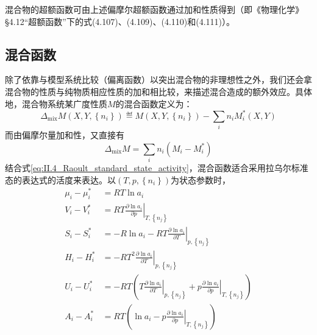 \documentclass[main.tex]{subfiles}
\begin{document}
混合物的超额函数可由上述偏摩尔超额函数通过加和性质得到（即《物理化学》\S4.12“超额函数”下的式(4.107)、(4.109)、(4.110)和(4.111)）。

\subsection{混合函数}\label{sec:II.4.6 mixing_function}
除了依靠与模型系统比较（偏离函数）以突出混合物的非理想性之外，我们还会拿混合物的性质与纯物质相应性质的加和相比较，来描述混合造成的额外效应。具体地，混合物系统某广度性质$M$的混合函数定义为：
\begin{equation}\label{eq:II.4_def_mixing_function}
  \Delta_\text{mix}M\left(X,Y,\left\{n_i\right\}\right)\eqdef M\left(X,Y,\left\{n_i\right\}\right)-\sum_in_iM_i^*\left(X,Y\right)
\end{equation}
而由偏摩尔量加和性，又直接有
\[\Delta_\text{mix}M=\sum_in_i\left(M_i-M_i^*\right)\]
结合式\eqref{eq:II.4_Raoult_standard_state_activity}，混合函数适合采用拉乌尔标准态的表达式的活度来表达。以$\left(T,p,\left\{n_i\right\}\right)$为状态参数时，
\begin{align}
  \mu_i-\mu_i^* & =RT\ln a_i\label{eq:II.4_chemical_potential_mixing_activity_expression}                                                                                                                                              \\
  V_i-V_i^*     & =RT\left.\frac{\partial\ln a_i}{\partial p}\right|_{T,\left\{n_j\right\}}\label{eq:II.4_partial_V_mixing_activity_expression}                                                                                        \\
  S_i-S_i^*     & =-R\ln a_i-RT\left.\frac{\partial\ln a_i}{\partial T}\right|_{p,\left\{n_j\right\}}\label{eq:II.4_partial_S_mixing_activity_expression}                                                                              \\
  H_i-H_i^*     & =-RT^2\left.\frac{\partial\ln a_i}{\partial T}\right|_{p,\left\{n_j\right\}}\label{eq:II.4_partial_H_mixing_activity_expression}                                                                                     \\
  U_i-U_i^*     & =-RT\left(T\left.\frac{\partial\ln a_i}{\partial T}\right|_{p,\left\{n_j\right\}}+p\left.\frac{\partial\ln a_i}{\partial p}\right|_{T,\left\{n_j\right\}}\right)\label{eq:II.4_partial_U_mixing_activity_expression} \\
  A_i-A_i^*     & =RT\left(\ln a_i-p\left.\frac{\partial\ln a_i}{\partial p}\right|_{T,\left\{n_j\right\}}\right)\label{eq:II.4_partial_A_mixing_activity_expression}
\end{align}
\end{document}
